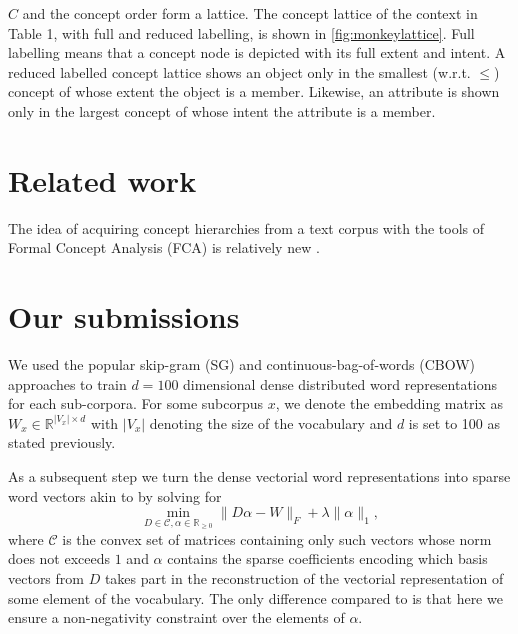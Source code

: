 \documentclass[11pt,a4paper]{article}
\begin{document}
$C$ and the concept order form a %
lattice.  The concept lattice of the context in Table 1, with full and reduced
labelling, is shown in \ref{fig:monkeylattice}.
Full labelling means that a concept node is depicted with its full extent and
intent. A reduced labelled concept lattice shows an object only in the smallest
(w.r.t. $\le$) concept of whose extent the object is a member.
Likewise, an attribute is shown only in the largest concept of whose intent the
attribute is a member.%

\section{Related work}

The idea of acquiring concept hierarchies from a text corpus with the tools of
Formal Concept Analysis (FCA) is relatively new \citep{Cimiano:2005}.

\section{Our submissions}

We used the popular skip-gram (SG) and continuous-bag-of-words (CBOW)
approaches \cite{Mikolov:2013f} to train $d=100$ dimensional dense distributed
word representations for each sub-corpora. For some subcorpus $x$, we denote
the embedding matrix as $W_x \in \mathbb{R}^{\lvert V_x \rvert \times d}$ with
$\lvert V_x \rvert$ denoting the size of the vocabulary and $d$ is set to 100
as stated previously.

As a subsequent step we turn the dense vectorial word representations into
sparse word vectors akin to \citet{Berend:2017} by solving for
\begin{equation}
\min\limits_{D \in \mathcal{C}, \alpha \in \mathbb{R}_{\geq0}} \lVert D\alpha - W \rVert_F + \lambda \lVert \alpha \rVert_1,
\label{nonneg_SPAMS_objective}
\end{equation}
where $\mathcal{C}$ is the convex set of matrices containing only such vectors
whose norm does not exceeds $1$ and $\alpha$ contains the sparse coefficients
encoding which basis vectors from $D$ takes part in the reconstruction of the
vectorial representation of some element of the vocabulary. The only difference
compared to \cite{Berend:2017} is that here we ensure a non-negativity
constraint over the elements of $\alpha$.
\end{document}
